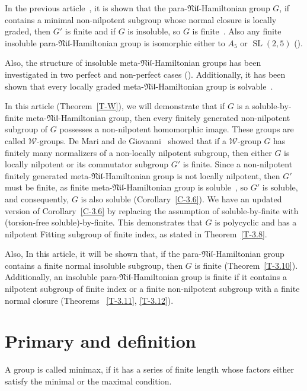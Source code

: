 \documentclass[11pt]{amsart}
\DeclareMathOperator{\SL}{SL}
\newcommand{\nil}{\mathfrak{Nil}}
\begin{document}
In the previous article~\cite{DM}, it is shown that the para-$\nil$-Hamiltonian group $G$, if contains a minimal non-nilpotent subgroup whose normal closure is locally graded, then $G'$ is finite and if $G$ is  insoluble, so $G$ is finite~\cite[Theorem 4.6, Corollary 4.7]{DM}. Also any finite insoluble para-$\nil$-Hamiltonian group is isomorphic either to $A_5$ or $\SL(2,5)$ (\cite[Theorem 3.6]{DM}).
 
Also, the structure of insoluble meta-$\nil$-Hamiltonian groups has been investigated in two perfect and non-perfect cases (\cite[Propositions 5.8, 5.9, 5.10]{DM}). Additionally, it has been shown that every locally graded meta-$\nil$-Hamiltonian group is solvable~\cite[Lemma 5.11]{DM}.

In this article (Theorem~\ref{T-W}), we will demonstrate that if $G$ is a soluble-by-finite meta-$\mathfrak{Nil}$-Hamiltonian group, then every finitely generated non-nilpotent subgroup of $G$ possesses a non-nilpotent homomorphic image. These groups are called $\mathcal{W}$-groups. De Mari and de Giovanni~\cite[Theorem A]{MaGi} showed that if a $\mathcal{W}$-group $G$ has finitely many normalizers of a non-locally nilpotent subgroup, then either $G$ is locally nilpotent or its commutator subgroup $G'$ is finite.
Since a non-nilpotent finitely generated meta-$\mathfrak{Nil}$-Hamiltonian group is not locally nilpotent, then $G'$ must be finite, as finite meta-$\mathfrak{Nil}$-Hamiltonian group is soluble~\cite[Theorem 3.10]{DM}, so $G'$ is soluble, and consequently, $G$ is also soluble (Corollary~\ref{C-3.6}). We have an updated version of Corollary~\ref{C-3.6} by replacing the assumption of soluble-by-finite with (torsion-free soluble)-by-finite. This demonstrates that $G$ is polycyclic and has a nilpotent Fitting subgroup of finite index, as stated in Theorem~\ref{T-3.8}.

Also, In this article, it will be shown that, if the para-$\nil$-Hamiltonian group contains a finite normal insoluble subgroup, then $G$ is finite (Theorem~\ref{T-3.10}). Additionally, an insoluble para-$\nil$-Hamiltonian group is finite if it contains a nilpotent subgroup of finite index or a finite non-nilpotent subgroup with a finite normal closure (Theorems ~\ref{T-3.11}, \ref{T-3.12}).

\section{Primary and definition}
A group is called minimax, if it has a series of finite length whose factors either satisfy the minimal or the maximal condition. 
\end{document}
